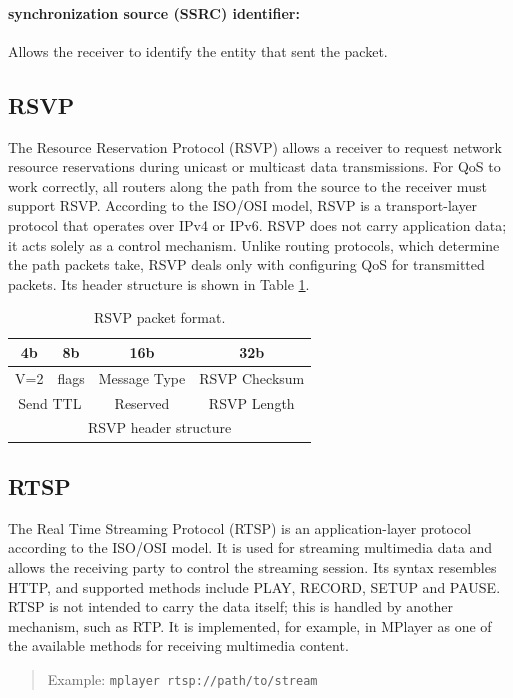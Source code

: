 \paragraph*{synchronization source (SSRC) identifier:} Allows the receiver to identify the entity that sent the packet.

\subsection{RSVP}\label{kap:RSVP}
The Resource Reservation Protocol (RSVP) \cite{RFC-2205-RSVP-Protocol} allows a receiver to request network resource reservations during unicast or multicast data transmissions. For QoS to work correctly, all routers along the path from the source to the receiver must support RSVP. According to the ISO/OSI model, RSVP is a transport-layer protocol that operates over IPv4 or IPv6. RSVP does not carry application data; it acts solely as a control mechanism. Unlike routing protocols, which determine the path packets take, RSVP deals only with configuring QoS for transmitted packets. Its header structure is shown in Table \ref{tab:RSVP-packet-format}.

\begin{table}[htp]
\centering
\begin{tabular}[t]{|c|c|c|c|}
4b & 8b & 16b & 32b \\
\hline	V=2 & flags & Message Type & RSVP Checksum \\
\hline	\multicolumn{2}{|c|}{Send TTL} & Reserved & RSVP Length \\
\hline	\multicolumn{4}{|c|}{RSVP header structure} \\
\hline
\end{tabular}
\caption{RSVP packet format.}
\label{tab:RSVP-packet-format}
\end{table}

\subsection{RTSP}\label{kap:RTSP}
The Real Time Streaming Protocol (RTSP) \cite{RFC-2326-RTSP-Protocol} is an application-layer protocol according to the ISO/OSI model. It is used for streaming multimedia data and allows the receiving party to control the streaming session. Its syntax resembles HTTP, and supported methods include PLAY, RECORD, SETUP and PAUSE. RTSP is not intended to carry the data itself; this is handled by another mechanism, such as RTP. It is implemented, for example, in MPlayer as one of the available methods for receiving multimedia content.
\begin{quote}
Example: \verb|mplayer rtsp://path/to/stream|
\end{quote}

